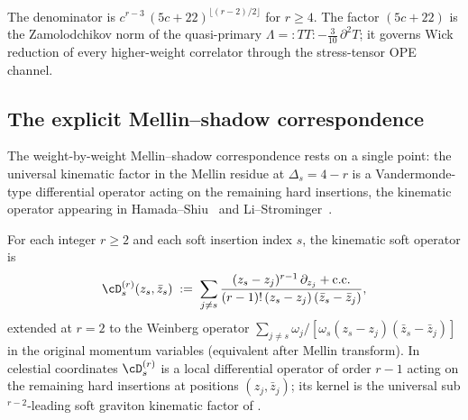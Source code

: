 \begin{remark}
\label{rem:smsb-pole-structure}
The denominator is $c^{r - 3}\,(5 c + 22)^{\lfloor (r - 2)/2 \rfloor}$
for $r \geq 4$. The factor $(5 c + 22)$ is the Zamolodchikov norm of
the quasi-primary $\Lambda = {:}T T{:} - \tfrac{3}{10}\,\partial^{2} T$;
it governs Wick reduction of every higher-weight correlator through the
stress-tensor OPE channel.
\end{remark}

\subsection{The explicit Mellin--shadow correspondence}
\label{subsec:smsb-bridge}

The weight-by-weight Mellin--shadow correspondence rests on a single point:
the universal kinematic factor in the Mellin
residue at $\Delta_s = 4 - r$ is a Vandermonde-type differential operator
acting on the remaining hard insertions, the
kinematic operator appearing in
Hamada--Shiu~\cite[(3.11)--(3.12)]{HamadaShiuSubsubSoft} and
Li--Strominger~\cite[\S 4]{LiStromingerHigherSoft}.

\begin{definition}
\label{def:smsb-kinematic-op}
\ClaimStatusProvedHere
For each integer $r \geq 2$ and each soft insertion index $s$, the
kinematic soft operator is
\[
 \cD_s^{(r)}(z_s, \bar z_s)
 \;:=\;
 \sum_{j \neq s}
 \frac{(z_s - z_j)^{r - 1}\,\partial_{z_j} + \text{c.c.}}{(r - 1)!\,
 (z_s - z_j)\,(\bar z_s - \bar z_j)},
\]
extended at $r = 2$ to the Weinberg operator $\sum_{j \neq s}
\omega_j / [\omega_s (z_s - z_j)(\bar z_s - \bar z_j)]$ in the original
momentum variables (equivalent after Mellin transform). In celestial
coordinates $\cD_s^{(r)}$ is a local differential operator of order
$r - 1$ acting on the remaining hard insertions at positions $(z_j,
\bar z_j)$; its kernel is the universal sub${}^{r-2}$-leading soft
graviton kinematic factor of \cite{HamadaShiuSubsubSoft,
LiStromingerHigherSoft}.
\end{definition}

